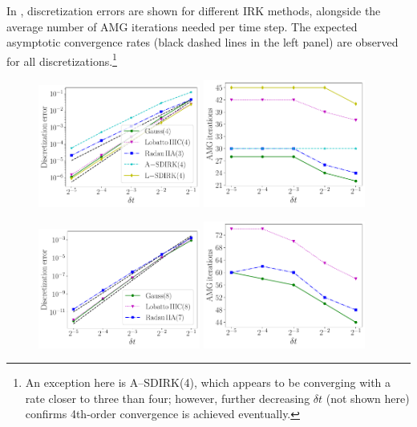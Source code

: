\documentclass[a4paper,10pt]{article}
\begin{document}
In , discretization errors are shown for different IRK
methods, alongside the average number of AMG iterations needed per time step.
The expected asymptotic convergence rates (black dashed lines in the left panel)
are observed for all discretizations.\footnote{An exception here is A--SDIRK(4),
which appears to be converging with a rate closer to three than four; however,
further decreasing $\delta t$ (not shown here) confirms 4th-order convergence
is achieved eventually.}

\begin{figure}[!htb]
\centerline{
\includegraphics[width = 0.475\textwidth]{figures/FD_ex/errors_iters_14_34_23_-14_4_d2_ex1.pdf}
\quad
\includegraphics[width = 0.475\textwidth]{figures/FD_ex/amg_iters_14_34_23_-14_4_d2_ex1.pdf}
}
\centerline{
\includegraphics[width = 0.475\textwidth]{figures/FD_ex/errors_iters_18_38_27_d2_ex1.pdf}
\quad
\includegraphics[width = 0.475\textwidth]{figures/FD_ex/amg_iters_18_38_27_d2_ex1.pdf}
}
\end{figure}
\end{document}
